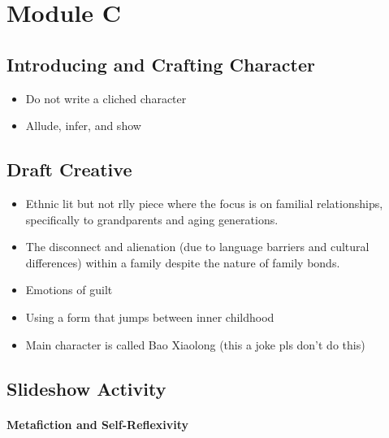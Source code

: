 
\chapter{Module C}

\section{Introducing and Crafting Character}

	\begin{itemize}
		\item Do not write a cliched character
		\item Allude, infer, and show
	\end{itemize}

\section{Draft Creative}

	\begin{itemize}
		\item Ethnic lit but not rlly piece where the focus is on familial relationships, specifically to grandparents and aging generations.
		\item The disconnect and alienation (due to language barriers and cultural differences) within a family despite the nature of family bonds.
		\item Emotions of guilt
		\item Using a form that jumps between inner childhood
		\item Main character is called Bao Xiaolong (this a joke pls don't do this)
	\end{itemize}

\section{Slideshow Activity}

	\subsubsection{Metafiction and Self-Reflexivity}
		
